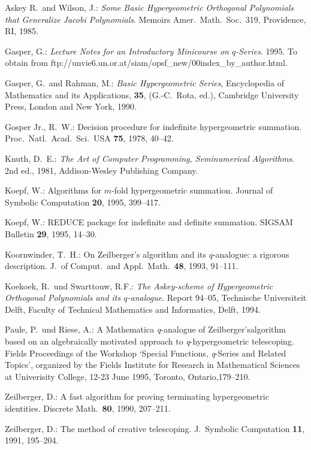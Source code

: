 
\begin{thebibliography}{99}

Askey R.\ and Wilson, J.:
{\sl Some Basic Hypergeometric Orthogonal Polynomials that Generalize Jacobi
Polynomials}. Memoirs Amer.\ Math.\ Soc.\ 319, Providence, RI, 1985.

Gasper, G.:
{\sl Lecture Notes for an Introductory Minicourse on $q$-Series}.
1995. To obtain from  
ftp://unvie6.un.or.at/siam/opsf\_new/\linebreak 00index\_by\_author.html.

Gasper, G.\ and Rahman, M.:
{\sl Basic Hypergeometric Series},
Encyclopedia of Mathematics and its Applications, 
{\bf 35}, (G.-C.\ Rota, ed.), Cambridge University Press,
London and New York, 1990.

Gosper Jr., R.\ W.:
Decision procedure for indefinite hypergeometric
summation. Proc.\ Natl.\ Acad.\ Sci.\ USA {\bf 75}, 1978, 40--42.

Knuth, D.\ E.:
{\sl The Art of Computer Programming, Seminumerical Algorithms}.
2nd ed., 1981, Addison-Wesley Publishing Company.

Koepf, W.:
Algorithms for $m$-fold hypergeometric summation.
Journal of Symbolic Computation {\bf 20}, 1995, 399--417.

Koepf, W.:
REDUCE package for indefinite and definite summation.
SIGSAM Bulletin {\bf 29}, 1995, 14--30.

Koornwinder, T.\ H.:
On Zeilberger's algorithm and its $q$-analogue: a rigorous description.
J.\ of Comput.\ and Appl.\ Math.\ {\bf 48}, 1993, 91--111.

Koekoek, R.\ und Swarttouw, R.F.:
{\sl The Askey-scheme of Hypergeometric Orthogonal
Polynomials and its $q$-analogue}. Report 94--05, Tech\-nische Universiteit
Delft, Faculty of Technical Mathematics and Informatics, Delft, 1994.


Paule, P.\ und Riese, A.:
A Mathematica \textsl{q}-analogue of Zeilberger's\linebreak[4]
algorithm based on an
algebraically motivated approach to \textsl{q}-hyper\-geometric telescoping.
Fields Proceedings of the Workshop `Special Functions, \textsl{q}-Series
and Related Topics', organized by the Fields Institute for Research in
Mathematical Sciences at Univerisity College,
12-23 June 1995, Toronto, Ontario,179--210.

Zeilberger, D.:
A fast algorithm for proving terminating hypergeometric identities.
Discrete Math.\ {\bf 80}, 1990, 207--211.

Zeilberger, D.:
The method of creative telescoping.
J.\ Symbolic Computation {\bf 11}, 1991, 195--204.

\end{thebibliography}



